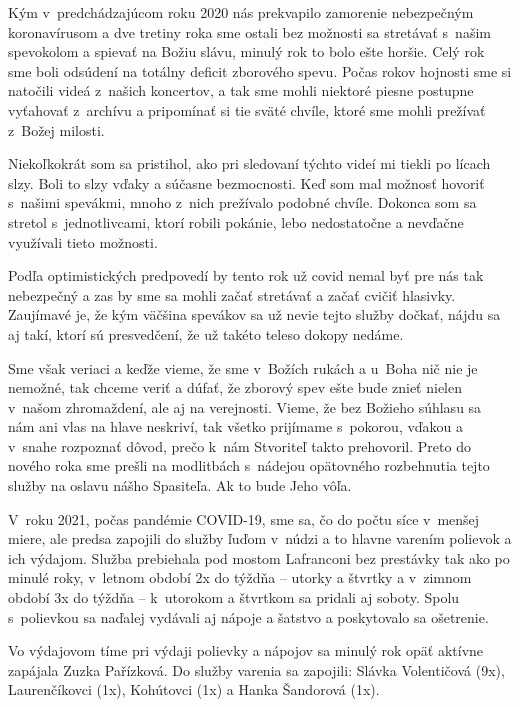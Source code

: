 

Kým v~predchádzajúcom roku 2020 nás prekvapilo zamorenie nebezpečným koronavírusom a dve tretiny roka sme ostali bez možnosti sa stretávať s~našim spevokolom a spievať na Božiu slávu, minulý rok to bolo ešte horšie. Celý rok sme boli odsúdení na totálny deficit zborového spevu.     
Počas rokov hojnosti sme si natočili videá z~našich koncertov, a tak sme mohli niektoré piesne postupne vyťahovať z~archívu a pripomínať si tie sväté chvíle, ktoré sme mohli prežívať z~Božej milosti. 

Niekoľkokrát som sa pristihol, ako pri sledovaní týchto videí mi tiekli po lícach slzy. Boli to slzy vďaky a súčasne bezmocnosti.
Keď som mal možnosť hovoriť s~našimi spevákmi, mnoho z~nich prežívalo podobné chvíle. Dokonca som sa stretol s~jednotlivcami, ktorí robili pokánie, lebo nedostatočne a nevďačne využívali tieto možnosti. 

Podľa optimistických predpovedí by tento rok už covid nemal byť pre nás tak nebezpečný a zas by sme sa mohli začať stretávať a začať cvičiť hlasivky. Zaujímavé je, že kým väčšina spevákov sa už nevie tejto služby dočkať, nájdu sa aj takí, ktorí sú presvedčení, že už takéto teleso dokopy nedáme. 

Sme však veriaci a keďže vieme, že sme v~Božích rukách a u~Boha nič nie je nemožné, tak chceme veriť a dúfať, že zborový spev ešte bude znieť nielen v~našom zhromaždení, ale aj na verejnosti.  
Vieme, že bez Božieho súhlasu sa nám ani vlas na hlave neskriví, tak všetko prijímame s~pokorou, vďakou a v~snahe rozpoznať dôvod, prečo k~nám Stvoriteľ takto prehovoril. 
Preto do nového roka sme prešli na modlitbách s~nádejou opätovného rozbehnutia tejto služby na oslavu nášho Spasiteľa. Ak to bude Jeho vôľa.



V~roku 2021, počas pandémie COVID-19, sme sa, čo do počtu síce v~menšej miere, ale predsa zapojili do služby ľuďom v~núdzi a to hlavne varením polievok a ich výdajom. Služba prebiehala pod mostom Lafranconi bez prestávky tak ako po minulé roky, v~letnom období 2x do týždňa -- utorky a štvrtky a v~zimnom období 3x do týždňa -- k~utorokom a štvrtkom sa pridali aj soboty. Spolu s~polievkou sa naďalej vydávali aj nápoje a šatstvo a poskytovalo sa ošetrenie.

Vo výdajovom tíme pri výdaji polievky a nápojov sa minulý rok opäť aktívne zapájala Zuzka Pařízková. Do služby varenia sa zapojili: Slávka Volentičová (9x), Laurenčíkovci (1x), Kohútovci (1x) a Hanka Šandorová (1x). 

